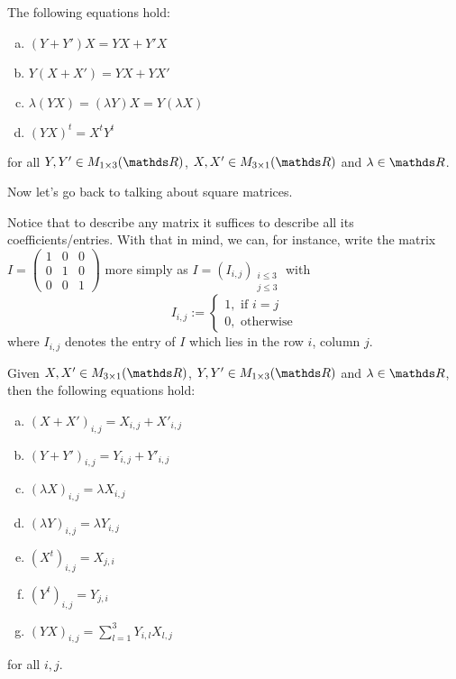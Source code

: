 \begin{prop}
	The following equations hold:
	\begin{enumerate}[a)]
		\item $(Y+Y')X=YX+Y'X$
		\item $Y(X+X')=YX+YX'$
		\item $\lambda(YX)=(\lambda Y)X=Y(\lambda X)$
		\item $(YX)^t=X^tY^t$
	\end{enumerate}for all $Y,Y'\in M_{1\times 3}(\R)$, $X,X'\in M_{3\times 1}(\R)$ and $\lambda\in \R$.
\end{prop}

Now let's go back to talking about square matrices.

\begin{rmk}
	Notice that to describe any matrix it suffices to describe all its coefficients/entries. With that in mind, we can, for instance, write the matrix $I=\begin{pmatrix}
	1&0&0\\
	0&1&0\\
	0&0&1
	\end{pmatrix}$ more simply as $I=(I_{i,j})_{\substack{i\leq 3\\j\leq 3}}$ with
	\[I_{i,j}:=\begin{cases}
	1,\mbox{ if }i=j\\
	0,\mbox{ otherwise}
	\end{cases}\]where $I_{i,j}$ denotes the entry of $I$ which lies in the row $i$, column $j$.
\end{rmk}

\begin{lemma}
	Given $X,X'\in M_{3\times 1}(\R)$, $Y,Y'\in M_{1\times 3}(\R)$ and $\lambda \in \R$, then the following equations hold:
	\begin{multicols}{2}
		\begin{enumerate}[a)]
			\item $(X+X')_{i,j}=X_{i,j}+X'_{i,j}$
			\item $(Y+Y')_{i,j}=Y_{i,j}+Y'_{i,j}$
			\item $(\lambda X)_{i,j}=\lambda X_{i,j}$
			\item $(\lambda Y)_{i,j}=\lambda Y_{i,j}$
			\item $(X^t)_{i,j}=X_{j,i}$
			\item $(Y^t)_{i,j}=Y_{j,i}$
			\item $(YX)_{i,j}=\sum_{l=1}^3 Y_{i,l}X_{l,j}$
		\end{enumerate}
	\end{multicols}
	for all $i,j$.
\end{lemma}

